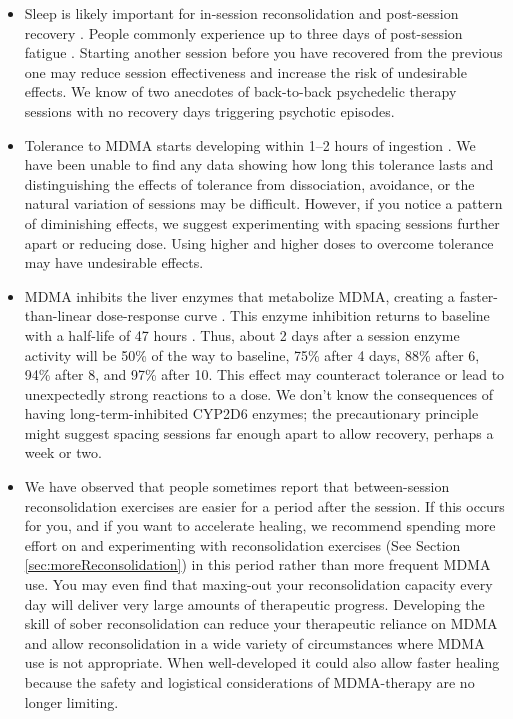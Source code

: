 \documentclass[12pt,letterpaper]{book}
\begin{document}
\begin{itemize}
    \item Sleep is likely important for in-session reconsolidation and post-session recovery \cite{simon2020sleep}. People commonly experience up to three days of post-session fatigue \cite{liechtiGender}. Starting another session before you have recovered from the previous one may reduce session effectiveness and increase the risk of undesirable effects. We know of two anecdotes of back-to-back psychedelic therapy sessions with no recovery days triggering psychotic episodes. 
    \item Tolerance to MDMA starts developing within 1–2 hours of ingestion \cite{farreTolerance,parrottTolerance}. We have been unable to find any data showing how long this tolerance lasts and distinguishing the effects of tolerance from dissociation, avoidance, or the natural variation of sessions may be difficult. However, if you notice a pattern of diminishing effects, we suggest experimenting with spacing sessions further apart or reducing dose. Using higher and higher doses to overcome tolerance may have undesirable effects.
    \item MDMA inhibits the liver enzymes that metabolize MDMA, creating a faster-than-linear dose-response curve \cite{de2000nonlinear}. This enzyme inhibition returns to baseline with a half-life of 47 hours \cite{omathunaCYP}. Thus, about 2 days after a session enzyme activity will be 50\% of the way to baseline, 75\% after 4 days, 88\% after 6, 94\% after 8, and 97\% after 10. This effect may counteract tolerance or lead to unexpectedly strong reactions to a dose. We don't know the consequences of having long-term-inhibited CYP2D6 enzymes; the precautionary principle might suggest spacing sessions far enough apart to allow recovery, perhaps a week or two.
    \item We have observed that people sometimes report that between-session reconsolidation exercises are easier for a period after the session. If this occurs for you, and if you want to accelerate healing, we recommend spending more effort on and experimenting with reconsolidation exercises (See Section \ref{sec:moreReconsolidation}) in this period rather than more frequent MDMA use. You may even find that maxing-out your reconsolidation capacity every day will deliver very large amounts of therapeutic progress. Developing the skill of sober reconsolidation can reduce your therapeutic reliance on MDMA and allow reconsolidation in a wide variety of circumstances where MDMA use is not appropriate. When well-developed it could also allow faster healing because the safety and logistical considerations of MDMA-therapy are no longer limiting.

\end{itemize}
\end{document}
